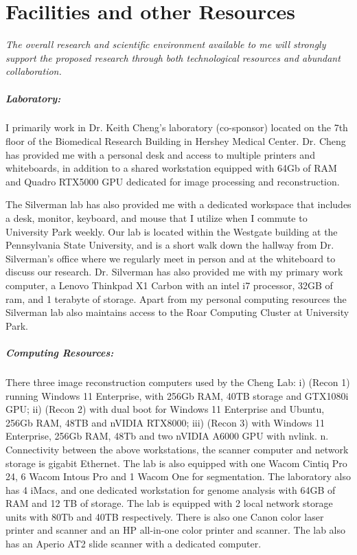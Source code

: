 \documentclass{NIHGrant}
\begin{document}

\part*{Facilities and other Resources}
\emph{The overall research and scientific environment available to me will strongly support the proposed research through both technological resources and abundant collaboration.}
\subsubsection*{Laboratory:} I primarily work in Dr. Keith Cheng's laboratory (co-sponsor) located on the 7th floor of the Biomedical Research Building in Hershey Medical Center. Dr. Cheng has provided me with a personal desk and access to multiple printers and whiteboards, in addition to a shared workstation equipped with 64Gb of RAM and Quadro RTX5000 GPU dedicated for image processing and reconstruction.

The Silverman lab has also provided me with a dedicated workspace that includes a desk, monitor, keyboard, and mouse that I utilize when I commute to University Park weekly. Our lab is located within the Westgate building at the
Pennsylvania State University, and is a short walk down the hallway from Dr. Silverman's office where we regularly meet in person and at the whiteboard to discuss our research.  Dr. Silverman has also provided me with my primary work computer, a Lenovo Thinkpad X1 Carbon with an intel i7 processor, 32GB of ram, and 1 terabyte of storage. Apart from my personal computing resources the Silverman lab also maintains access to the Roar Computing Cluster at University Park.

\subsubsection*{Computing Resources:} There three image reconstruction computers used by the Cheng Lab: i) (Recon 1) running Windows 11 Enterprise,  with 256Gb RAM, 40TB storage and GTX1080i GPU; ii) (Recon 2) with dual boot for Windows 11 Enterprise and Ubuntu, 256Gb RAM, 48TB and nVIDIA RTX8000; iii) (Recon 3) with Windows 11 Enterprise, 256Gb RAM, 48Tb and two nVIDIA A6000 GPU with nvlink. n. Connectivity between the above workstations, the scanner computer and network storage is gigabit Ethernet. The lab is also equipped with one Wacom Cintiq Pro 24, 6 Wacom Intous Pro and 1 Wacom One for segmentation. The laboratory also has 4 iMacs, and one dedicated workstation for genome analysis with 64GB of RAM and 12 TB of storage. The lab is equipped with 2 local network storage units with 80Tb and 40TB respectively. There is also one Canon color laser printer and scanner and an HP all-in-one color printer and scanner. The lab also has an Aperio AT2 slide scanner with a dedicated computer.
\end{document}
